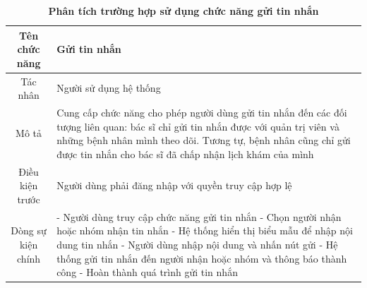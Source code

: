 \begin{table}[H]
	\caption{\bfseries \fontsize{12pt}{0pt}\selectfont Phân tích trường hợp sử dụng chức năng gửi tin nhắn}
	\centering
	\begin{tabularx}{0.9\textwidth}{|c|X|}
		\hline
		\textbf{Tên chức năng} & \textbf{Gửi tin nhắn}                                                                                                                                                                                                                                       \\
		\hline
		Tác nhân               & Người sử dụng hệ thống                                                                                                                                                                                                                                      \\
		\hline
		Mô tả                  & Cung cấp chức năng cho phép người dùng gửi tin nhắn đến các đối tượng liên quan: bác sĩ chỉ gửi tin nhắn được với quản trị viên và những bệnh nhân mình theo dõi. Tương tự, bệnh nhân cũng chỉ gửi được tin nhắn cho bác sĩ đã chấp nhận lịch khám của mình \\
		\hline
		Điều kiện trước        & Người dùng phải đăng nhập với quyền truy cập hợp lệ                                                                                                                                                                                                         \\
		\hline
		Dòng sự kiện chính     &
		- Người dùng truy cập chức năng gửi tin nhắn \newline
		- Chọn người nhận hoặc nhóm nhận tin nhắn \newline
		- Hệ thống hiển thị biểu mẫu để nhập nội dung tin nhắn \newline
		- Người dùng nhập nội dung và nhấn nút gửi \newline
		- Hệ thống gửi tin nhắn đến người nhận hoặc nhóm và thông báo thành công \newline
		- Hoàn thành quá trình gửi tin nhắn                                                                                                                                                                                                                                                  \\
		\hline
	\end{tabularx}
\end{table}

